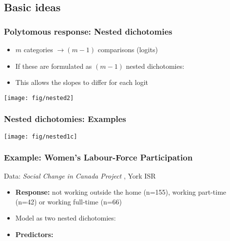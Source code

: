 \renewcommand{\FileName}{nested}
\subsection{Basic ideas}
\begin{frame}
  \frametitle{Polytomous response: Nested dichotomies}
  \begin{itemize}
    \item $m$ categories $\rightarrow (m-1)$ comparisons (logits)
	\item If these are formulated as $(m-1)$ nested dichotomies:
	\item This allows the slopes to differ for each logit
  \end{itemize}
\begin{center}
  \texttt{[image: fig/nested2]}
\end{center}
\end{frame}

\begin{frame}
\begin{center}
  \frametitle{Nested dichotomies: Examples}
  \texttt{[image: fig/nested1c]}
\end{center}
 
\end{frame}

\begin{frame}
  \frametitle{Example: Women's Labour-Force Participation}
Data: \emph{Social Change in Canada Project} , York ISR \citep{Fox:97}
  \begin{itemize}
	\item{\large\bfseries Response:} not working
outside the home (n=155), working part-time (n=42)  or working
full-time (n=66)
   \item Model as two nested dichotomies:

	\item{\large\bfseries Predictors:}
  \end{itemize}
\end{frame}

